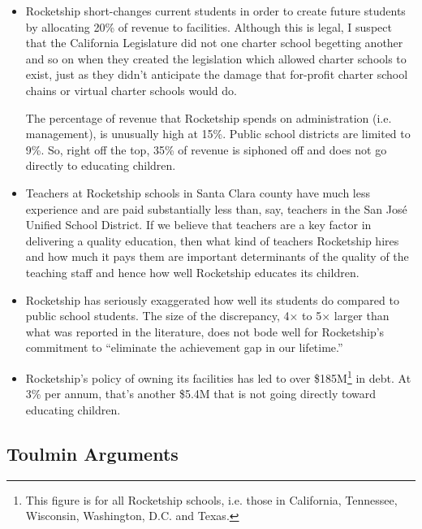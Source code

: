 \begin{enumerate}[topsep=0.3\baselineskip,itemsep=0.25\baselineskip]
\begin{itemize}[topsep=0.3\baselineskip,itemsep=0.25\baselineskip]
      \item Rocketship short-changes current students in order to create future students by allocating 20\% of revenue to facilities. Although this is  legal, I suspect that the California Legislature did not one charter school begetting another and so on when they created the legislation which allowed charter schools to exist, just as they didn't anticipate the damage that for-profit charter school chains or virtual charter schools would do. 

      The percentage of revenue that Rocketship spends on administration (i.e. management), is unusually high at 15\%. Public school districts are limited to 9\%. So, right off the top, 35\% of revenue is siphoned off and does not go directly to educating children.

      \item Teachers at Rocketship schools in Santa Clara county have much less experience and are paid substantially less than, say, teachers in the San José Unified School District. If we believe that teachers are a key factor in delivering a quality education, then what kind of teachers Rocketship hires and how much it pays them are important determinants of the quality of the teaching staff and hence how well Rocketship educates its children.

      \item Rocketship has seriously exaggerated how well its students do compared to public school students. The size of the discrepancy, 4× to 5× larger than what was reported in the literature, does not bode well for Rocketship's commitment to ``eliminate the achievement gap in our lifetime.''
      
      \item Rocketship's policy of owning its facilities has led to over \$185M\footnote{This figure is for all Rocketship schools, i.e. those in  California, Tennessee, Wisconsin, Washington, D.C. and Texas.} in debt. At 3\% per annum, that's another \$5.4M that is not going directly toward educating children.
    \end{itemize}
  \end{enumerate}

\subsection{Toulmin Arguments}%
\label{sec:toulmin-arguments}\indent%

